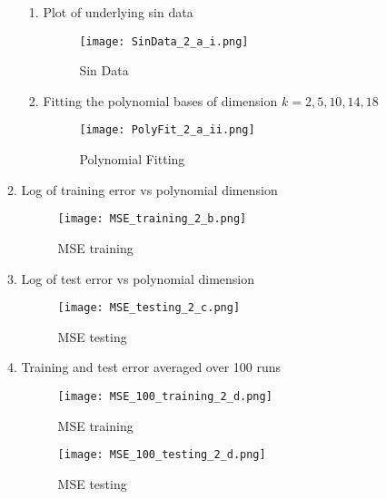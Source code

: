 \documentclass{article}
\begin{document}
\begin{enumerate}
\begin{enumerate}[label=\alph*.]
        \begin{enumerate}[label=\roman*.]
          \item Plot of underlying sin data
              \begin{figure}[H]
                \centering
                \texttt{[image: SinData\_2\_a\_i.png]}
                \caption{\label{fig:SinData_2_a_i}Sin Data}
              \end{figure}
          \item Fitting the polynomial bases of dimension $k=2,5,10,14,18$
            \begin{figure}[H]
                \centering
                \texttt{[image: PolyFit\_2\_a\_ii.png]}
                \caption{\label{fig:PolyFit_2_a_ii}Polynomial Fitting}
            \end{figure}
        \end{enumerate}
      \item Log of training error vs polynomial dimension
            \begin{figure}[H]
                \centering
                \texttt{[image: MSE\_training\_2\_b.png]}
                \caption{\label{fig:MSE_training_2_b}MSE training}
            \end{figure}
      \item Log of test error vs polynomial dimension
            \begin{figure}[H]
                \centering
                \texttt{[image: MSE\_testing\_2\_c.png]}
                \caption{\label{fig:MSE_testing_2_c}MSE testing}
            \end{figure}
      \item Training and test error averaged over 100 runs
        \begin{figure}[ht]
          \centering
          \begin{minipage}[b]{0.45\textwidth}
            \texttt{[image: MSE\_100\_training\_2\_d.png]}
            \caption{\label{fig:MSE_100_training_2_d}MSE training}
          \end{minipage}
          \begin{minipage}[b]{0.45\textwidth}
            \texttt{[image: MSE\_100\_testing\_2\_d.png]}
            \caption{\label{fig:MSE_100_testing_2_d}MSE testing}
          \end{minipage}
        \end{figure}
    \end{enumerate}

\end{enumerate}
\end{document}
